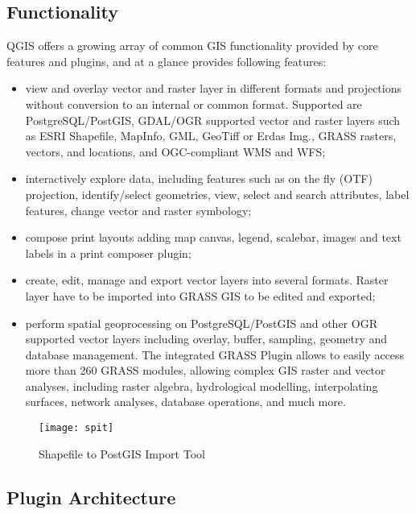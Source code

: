\subsection{Functionality}

QGIS offers a growing array of common GIS functionality provided by core
features and plugins, and at a glance provides following features: 

\begin{itemize}
\item view and overlay vector and raster layer in different formats and
projections without conversion to an internal or common format. Supported are
PostgreSQL/PostGIS, GDAL/OGR supported vector and raster layers such as ESRI
Shapefile, MapInfo, GML, GeoTiff or Erdas Img., GRASS rasters, vectors, and
locations, and
OGC-compliant WMS and WFS;
\item interactively explore data, including features such as on the fly
(OTF) projection, identify/select geometries, view, select and search
attributes, label features, change vector and raster symbology; 
\item compose print layouts adding map canvas, legend, scalebar, images and
text labels in a print composer plugin;
\item create, edit, manage and export vector layers into several formats.
Raster layer have to be imported into GRASS GIS to be edited and
exported;
\item perform spatial geoprocessing on PostgreSQL/PostGIS and other OGR
supported vector layers including overlay, buffer, sampling, geometry and
database management. The integrated GRASS Plugin allows to easily access more
than 260 GRASS modules, allowing complex GIS raster and vector analyses,
including raster algebra, hydrological modelling, interpolating surfaces,
network analyses, database operations, and much more.
\end{itemize}

\begin{figure}[h]
   \begin{center}
   \caption{Shapefile to PostGIS Import Tool}
    \label{fig:spit}\smallskip
   \texttt{[image: spit]}
\end{center}
\end{figure}

\subsection{Plugin Architecture}


